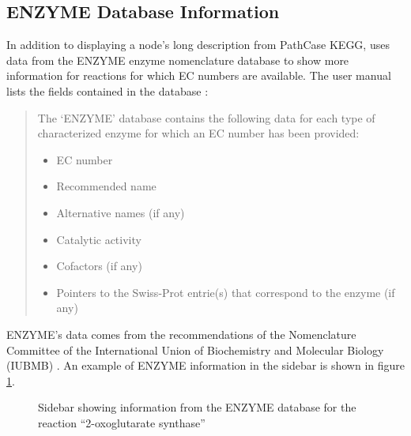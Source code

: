 \subsection{ENZYME Database Information}

In addition to displaying a node's long description from PathCase KEGG, \keggapp
uses data from the ENZYME enzyme nomenclature database \cite{enzyme-database} to
show more information for reactions for which EC numbers are available. The user
manual lists the fields contained in the database \cite{enzyme:enzuser}:

\begin{quote}

    The `ENZYME' database contains the following data for each type of
    characterized enzyme for which an EC number has been provided:

    \begin{itemize}
        \item EC number
        \item Recommended name
        \item Alternative names (if any)
        \item Catalytic activity
        \item Cofactors (if any)
        \item Pointers to the Swiss-Prot entrie(s) that correspond to the enzyme (if any)
    \end{itemize}

\end{quote}

ENZYME's data comes from the recommendations of the Nomenclature Committee of
the International Union of Biochemistry and Molecular Biology (IUBMB)
\cite{enzyme-database}. An example of ENZYME information in the sidebar is shown
in figure \ref{fig:kegg_screenshot_selection_info}.

\begin{figure}[hbtp]
    \caption{\label{fig:kegg_screenshot_selection_info} Sidebar showing
    information from the ENZYME database for the reaction ``2-oxoglutarate
    synthase''}
\end{figure}
